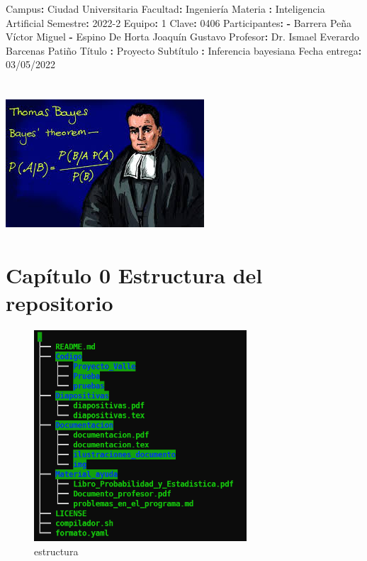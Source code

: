 \documentclass[
  spanish,
]{article}
\author{}
\date{}
\newenvironment{Shaded}{}{}
\newcommand{\AttributeTok}[1]{\textcolor[rgb]{0.49,0.56,0.16}{#1}}
\newcommand{\DecValTok}[1]{\textcolor[rgb]{0.25,0.63,0.44}{#1}}
\newcommand{\FunctionTok}[1]{\textcolor[rgb]{0.02,0.16,0.49}{#1}}
\newcommand{\KeywordTok}[1]{\textcolor[rgb]{0.00,0.44,0.13}{\textbf{#1}}}
\begin{document}
\begin{Shaded}
\begin{Highlighting}[]
\FunctionTok{Campus}\KeywordTok{:}\AttributeTok{ Ciudad Universitaria}
\FunctionTok{Facultad}\KeywordTok{:}\AttributeTok{ Ingeniería}
\FunctionTok{Materia }\KeywordTok{:}\AttributeTok{ Inteligencia Artificial}
\FunctionTok{Semestre}\KeywordTok{:}\AttributeTok{ 2022{-}2}
\FunctionTok{Equipo}\KeywordTok{:}\AttributeTok{ }\DecValTok{1}
\FunctionTok{Clave}\KeywordTok{:}\AttributeTok{ }\DecValTok{0406}
\FunctionTok{Participantes}\KeywordTok{:}\AttributeTok{ }
\KeywordTok{{-}}\AttributeTok{ Barrera Peña Víctor Miguel}
\KeywordTok{{-}}\AttributeTok{ Espino De Horta Joaquín Gustavo}
\AttributeTok{    }
\FunctionTok{Profesor}\KeywordTok{:}\AttributeTok{ Dr. Ismael Everardo Barcenas Patiño}
\FunctionTok{Título }\KeywordTok{:}\AttributeTok{ Proyecto }
\FunctionTok{Subtítulo }\KeywordTok{:}\AttributeTok{ Inferencia bayesiana}
\FunctionTok{Fecha entrega}\KeywordTok{:}\AttributeTok{ 03/05/2022}
\end{Highlighting}
\end{Shaded}

\hypertarget{portada}{%
\section{\texorpdfstring{\protect\includegraphics{img/README/portada.jpg}}{portada}}\label{portada}}

\pagebreak

\hypertarget{capuxedtulo-0-estructura-del-repositorio}{%
\section{Capítulo 0 Estructura del
repositorio}\label{capuxedtulo-0-estructura-del-repositorio}}

\begin{figure}
\centering
\includegraphics[width=3.125in,height=\textheight]{img/README/estructura.png}
\caption{estructura}
\end{figure}
\end{document}
